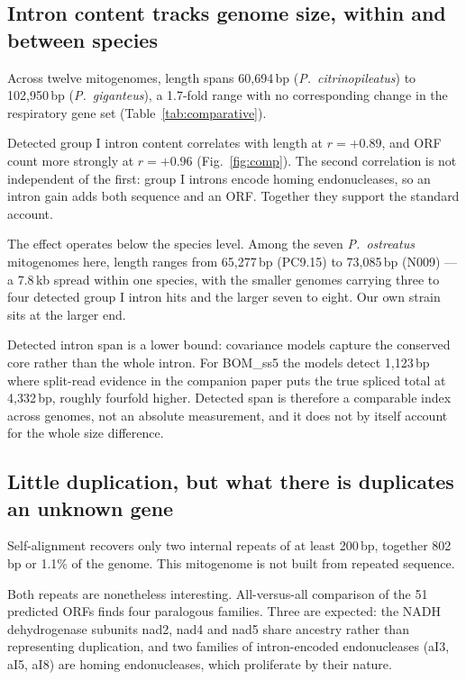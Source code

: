 \subsection{Intron content tracks genome size, within and between species}

Across twelve mitogenomes, length spans 60,694\,bp (\textit{P.\ citrinopileatus}) to
102,950\,bp (\textit{P.\ giganteus}), a 1.7-fold range with no corresponding change in the
respiratory gene set (Table~\ref{tab:comparative}).

Detected group I intron content correlates with length at $r=+0.89$, and ORF count more
strongly at $r=+0.96$ (Fig.~\ref{fig:comp}). The second correlation is not independent of the
first: group I introns encode homing endonucleases, so an intron gain adds both sequence and an
ORF. Together they support the standard account.

The effect operates below the species level. Among the seven \textit{P.\ ostreatus} mitogenomes
here, length ranges from 65,277\,bp (PC9.15) to 73,085\,bp (N009) --- a 7.8\,kb spread within
one species, with the smaller genomes carrying three to four detected group I intron hits and
the larger seven to eight. Our own strain sits at the larger end.

Detected intron span is a lower bound: covariance models capture the conserved core rather than
the whole intron. For BOM\_ss5 the models detect 1,123\,bp where split-read evidence in the
companion paper puts the true spliced total at 4,332\,bp, roughly fourfold higher. Detected
span is therefore a comparable index across genomes, not an absolute measurement, and it does
not by itself account for the whole size difference.

\subsection{Little duplication, but what there is duplicates an unknown gene}

Self-alignment recovers only two internal repeats of at least 200\,bp, together 802\,bp or
1.1\% of the genome. This mitogenome is not built from repeated sequence.

Both repeats are nonetheless interesting. All-versus-all comparison of the 51 predicted ORFs
finds four paralogous families. Three are expected: the NADH dehydrogenase subunits nad2, nad4
and nad5 share ancestry rather than representing duplication, and two families of intron-encoded
endonucleases (aI3, aI5, aI8) are homing endonucleases, which proliferate by their nature.

